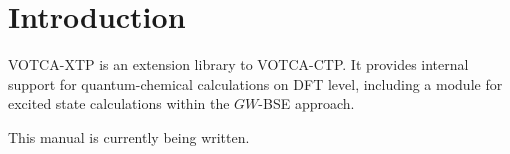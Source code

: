 \chapter{Introduction}
VOTCA-XTP is an extension library to VOTCA-CTP. It provides internal support for quantum-chemical calculations on DFT level, including a module for excited state calculations within the $GW$-BSE approach.


This manual is currently being written.


